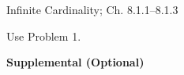 \documentclass[handout]{mcs}
\begin{document}


\begin{staffnotes}
Infinite Cardinality;  Ch. 8.1.1--8.1.3
\end{staffnotes}


\hint Use Problem 1.




\begin{center}
\textbf{Supplemental (Optional)}
\end{center}




\end{document}
